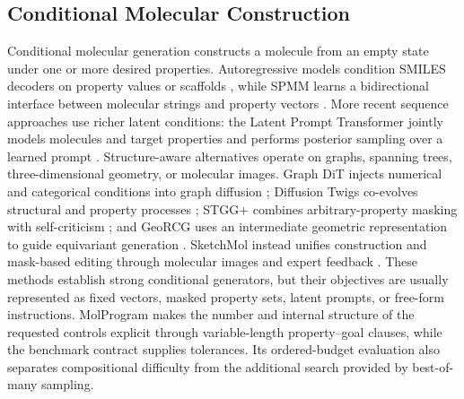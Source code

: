 \documentclass{article}
\begin{document}
\subsection{Conditional Molecular Construction}
Conditional molecular generation constructs a molecule from an empty state
under one or more desired properties. Autoregressive models condition SMILES
decoders on property values or scaffolds \citep{bagal2022molgpt}, while SPMM
learns a bidirectional interface between molecular strings and property vectors
\citep{chang2024spmm}. More recent sequence approaches use richer latent
conditions: the Latent Prompt Transformer jointly models molecules and target
properties and performs posterior sampling over a learned prompt
\citep{kong2024lpt}. Structure-aware alternatives operate on graphs, spanning
trees, three-dimensional geometry, or molecular images. Graph DiT injects
numerical and categorical conditions into graph diffusion
\citep{liu2024graphdit}; Diffusion Twigs co-evolves structural and property
processes \citep{mercatali2024twigs}; STGG+ combines arbitrary-property masking
with self-criticism \citep{jolicoeurmartineau2024stggplus}; and GeoRCG uses an
intermediate geometric representation to guide equivariant generation
\citep{li2025georcg}. SketchMol instead unifies construction and mask-based
editing through molecular images and expert feedback \citep{wang2025sketchmol}.
These methods establish strong conditional generators, but their objectives are
usually represented as fixed vectors, masked property sets, latent prompts, or
free-form instructions. MolProgram makes the number and internal structure of
the requested controls explicit through variable-length property--goal clauses,
while the benchmark contract supplies tolerances. Its ordered-budget
evaluation also separates compositional difficulty from the additional search
provided by best-of-many sampling.
\end{document}
